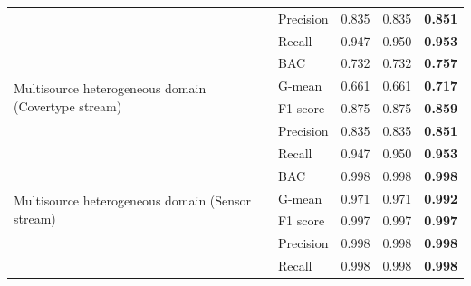 \begin{table}[H]
{\begin{tabular}{|l|l|c|c|c|}
                                                 & Precision       & 0.835          & 0.835         & \textbf{0.851} \\ \cline{2-5} 
                                                 & Recall          & 0.947          & 0.950         & \textbf{0.953} \\ \hline
  \multirow{4}{*}{Multisource heterogeneous domain (Covertype stream)} & BAC & 0.732  & 0.732         & \textbf{0.757} \\ \cline{2-5} 
                                                 & G-mean          & 0.661          & 0.661         & \textbf{0.717} \\ \cline{2-5} 
                                                 & F1 score        & 0.875          & 0.875         & \textbf{0.859} \\ \cline{2-5} 
                                                 & Precision       & 0.835          & 0.835         & \textbf{0.851} \\ \cline{2-5} 
                                                 & Recall          & 0.947          & 0.950         & \textbf{0.953} \\ \hline
  \multirow{4}{*}{Multisource heterogeneous domain (Sensor stream)} & BAC & 0.998  & 0.998         & \textbf{0.998} \\ \cline{2-5} 
                                                 & G-mean          & 0.971          & 0.971         & \textbf{0.992} \\ \cline{2-5} 
                                                 & F1 score        & 0.997          & 0.997         & \textbf{0.997} \\ \cline{2-5} 
                                                 & Precision       & 0.998          & 0.998         & \textbf{0.998} \\ \cline{2-5} 
                                                 & Recall          & 0.998          & 0.998         & \textbf{0.998} \\ \hline
  \end{tabular}
  }

  \label{table:6_table2}
  \end{table}

